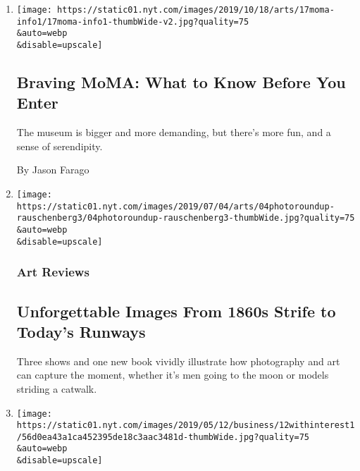 \begin{enumerate}
\def\labelenumi{\arabic{enumi}.}
\item
  \href{/2019/10/17/arts/design/new-moma-what-to-know.html}{}

  \texttt{[image: https://static01.nyt.com/images/2019/10/18/arts/17moma-info1/17moma-info1-thumbWide-v2.jpg?quality=75\\\&auto=webp\\\&disable=upscale]}

  \hypertarget{braving-moma-what-to-know-before-you-enter}{%
  \subsection{Braving MoMA: What to Know Before You
  Enter}\label{braving-moma-what-to-know-before-you-enter}}

  The museum is bigger and more demanding, but there's more fun, and a
  sense of serendipity.

  By Jason Farago
\item
  \href{/2019/07/03/arts/design/fashion-phaidon-rauschenberg-matthew-marks-photography-moon-pop-art.html}{}

  \texttt{[image: https://static01.nyt.com/images/2019/07/04/arts/04photoroundup-rauschenberg3/04photoroundup-rauschenberg3-thumbWide.jpg?quality=75\\\&auto=webp\\\&disable=upscale]}

  \hypertarget{art-reviews}{%
  \subsubsection{Art Reviews}\label{art-reviews}}

  \hypertarget{unforgettable-images-from-1860s-strife-to-todays-runways}{%
  \subsection{Unforgettable Images From 1860s Strife to Today's
  Runways}\label{unforgettable-images-from-1860s-strife-to-todays-runways}}

  Three shows and one new book vividly illustrate how photography and
  art can capture the moment, whether it's men going to the moon or
  models striding a catwalk.
\item
  \href{/2019/05/11/business/the-week-in-business-drug-costs-uber-china-trade.html}{}

  \texttt{[image: https://static01.nyt.com/images/2019/05/12/business/12withinterest1/56d0ea43a1ca452395de18c3aac3481d-thumbWide.jpg?quality=75\\\&auto=webp\\\&disable=upscale]}


\end{enumerate}
